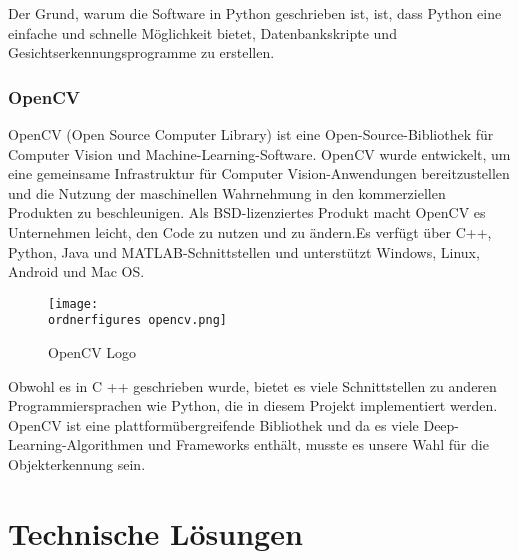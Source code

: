 \bigbreak
Der Grund, warum die Software in Python geschrieben ist, ist, dass Python eine einfache und schnelle Möglichkeit bietet, Datenbankskripte und Gesichtserkennungsprogramme zu erstellen.
\subsubsection{OpenCV}
OpenCV (Open Source Computer Library) ist eine Open-Source-Bibliothek für Computer Vision und Machine-Learning-Software. OpenCV wurde entwickelt, um eine gemeinsame Infrastruktur für Computer Vision-Anwendungen bereitzustellen und die Nutzung der maschinellen Wahrnehmung in den kommerziellen Produkten zu beschleunigen. Als BSD-lizenziertes Produkt macht OpenCV es Unternehmen leicht, den Code zu nutzen und zu ändern.Es verfügt über C++, Python, Java und MATLAB-Schnittstellen und unterstützt Windows, Linux, Android und Mac OS.\cite{OpenCV1}
\begin{figure}[ht]
	\centering
	\texttt{[image: \\ordnerfigures opencv.png]}
	\caption{ OpenCV Logo}
	\label{fig:opencv}
	\cite{OpenCVlogo}
\end{figure}
\bigbreak
Obwohl es in C ++ geschrieben wurde, bietet es viele Schnittstellen zu anderen Programmiersprachen wie Python, die in diesem Projekt implementiert werden. OpenCV ist eine plattformübergreifende Bibliothek und da es viele Deep-Learning-Algorithmen und Frameworks enthält, musste es unsere Wahl für die Objekterkennung sein.
\section{Technische Lösungen}
